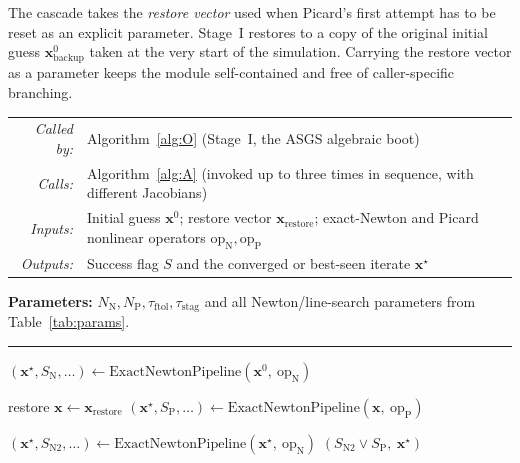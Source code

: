 \documentclass{article}
\makeatletter
\newcommand{\textftol}{\tau_{\mathrm{ftol}}}
\newcommand{\textstag}{\tau_{\mathrm{stag}}}
\newcommand{\moduleinterface}[4]{%
\begin{interfacecard}
\footnotesize
\begin{tabular}{@{}r@{\quad}p{0.82\textwidth}@{}}
\textit{Called by:} & #1 \\
\textit{Calls:}     & #2 \\
\textit{Inputs:}    & #3 \\
\textit{Outputs:}   & #4 \\
\end{tabular}
\end{interfacecard}
}
\makeatother
\begin{document}
The cascade takes the \emph{restore vector} used when Picard's first
attempt has to be reset as an explicit parameter. Stage~I restores to a
copy of the original initial guess $\boldsymbol{x}^0_{\mathrm{backup}}$
taken at the very start of the simulation. Carrying the restore vector as
a parameter keeps the module self-contained and free of caller-specific
branching.

\moduleinterface
    {Algorithm~\ref{alg:O} (Stage~I, the ASGS algebraic boot)}
    {Algorithm~\ref{alg:A} (invoked up to three times in sequence, with different Jacobians)}
    {Initial guess $\boldsymbol{x}^0$; restore vector $\boldsymbol{x}_{\mathrm{restore}}$; exact-Newton and Picard nonlinear operators $\mathrm{op}_{\mathrm{N}}, \mathrm{op}_{\mathrm{P}}$}
    {Success flag $S$ and the converged or best-seen iterate $\boldsymbol{x}^\star$}

\begin{algorithm}[H]
\caption{$\mathrm{RobustNonlinearCascade}$: the Newton $\to$ Picard $\to$ Newton cascade, used by Stage~I (the ASGS boot). Stage~I instantiates $\boldsymbol{x}_{\mathrm{restore}}$ with a backup copy of the initial guess.}
\label{alg:B}
\SetAlgoLined
\textbf{Parameters:} $N_{\mathrm{N}}, N_{\mathrm{P}}, \textftol, \textstag$ and all Newton/line-search parameters from Table~\ref{tab:params}.\\
\vspace{0.2cm}\hrule\vspace{0.2cm}
$(\boldsymbol{x}^\star, S_{\mathrm{N}}, \dots) \gets \mathrm{ExactNewtonPipeline}(\boldsymbol{x}^0,\ \mathrm{op}_{\mathrm{N}})$\;

restore $\boldsymbol{x} \gets \boldsymbol{x}_{\mathrm{restore}}$\;
$(\boldsymbol{x}^\star, S_{\mathrm{P}}, \dots) \gets \mathrm{ExactNewtonPipeline}(\boldsymbol{x},\ \mathrm{op}_{\mathrm{P}})$\;

$(\boldsymbol{x}^\star, S_{\mathrm{N2}}, \dots) \gets \mathrm{ExactNewtonPipeline}(\boldsymbol{x}^\star,\ \mathrm{op}_{\mathrm{N}})$\;
\Return $(S_{\mathrm{N2}} \vee S_{\mathrm{P}},\ \boldsymbol{x}^\star)$\;
\end{algorithm}
\end{document}
